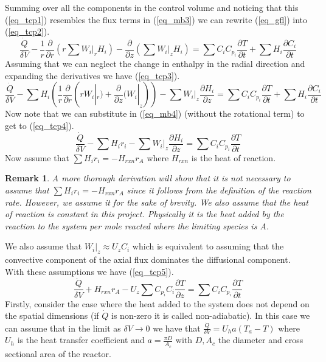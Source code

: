 \documentclass[11pt,fleqn]{article}
\theoremstyle{defstyle}
\newtheorem{rmrk}{Remark}[section]
\begin{document}
Summing over all the components in the control volume and noticing that this (\ref{eq_tcp1}) resembles the flux terms in (\ref{eq_mb3}) we can rewrite (\ref{eq_gfl}) into (\ref{eq_tcp2}).
\begin{equation}
\frac{\dot{Q}}{\delta V} - \frac{1}{r}\frac{\partial}{\partial r}(r\sum W_i|_r H_i) - \frac{\partial}{\partial z}(\sum W_i|_z H_i) =\sum C_i C_{p_i} \frac{\partial T}{\partial t} + \sum H_i \frac{\partial C_i}{\partial t}
\label{eq_tcp2}
\end{equation}
Assuming that we can neglect the change in enthalpy in the radial direction and expanding the derivatives we have (\ref{eq_tcp3}).
\begin{equation}
\frac{\dot{Q}}{\delta V} - \sum H_i (\frac{1}{r}\frac{\partial}{\partial r}(r W_i|_r)+\frac{\partial}{\partial z}(W_i|_z)) - \sum W_i|_z \frac{\partial H_i}{\partial z} =\sum C_i C_{p_i} \frac{\partial T}{\partial t} + \sum H_i \frac{\partial C_i}{\partial t}
\label{eq_tcp3}
\end{equation}
Now note that we can substitute in (\ref{eq_mb4}) (without the rotational term) to get to (\ref{eq_tcp4}).
\begin{equation}
\frac{\dot{Q}}{\delta V} - \sum H_i r_i - \sum W_i|_z \frac{\partial H_i}{\partial z} =\sum C_i C_{p_i} \frac{\partial T}{\partial t}
\label{eq_tcp4}
\end{equation}
Now assume that $\sum H_i r_i = -H_{rxn}r_A$ where $H_{rxn}$ is the heat of reaction.
\begin{rmrk}
A more thorough derivation will show that it is not necessary to assume that $\sum H_i r_i = -H_{rxn}r_A$ since it follows from the definition of the reaction rate. However, we assume it for the sake of brevity. We also assume that the heat of reaction is constant in this project. Physically it is the heat added by the reaction to the system per mole reacted where the limiting species is A.
\end{rmrk}
We also assume that $W_i|_z \approx U_z C_i$ which is equivalent to assuming that the convective component of the axial flux dominates the diffusional component. With these assumptions we have (\ref{eq_tcp5}).
\begin{equation}
\frac{\dot{Q}}{\delta V} + H_{rxn}r_A - U_z\sum C_{p_i}C_i \frac{\partial T}{\partial z} =\sum C_i C_{p_i} \frac{\partial T}{\partial t}
\label{eq_tcp5}
\end{equation}
Firstly, consider the case where the heat added to the system does not depend on the spatial dimensions (if $\dot{Q}$ is non-zero it is called non-adiabatic). In this case we can assume that in the limit as $\delta V \rightarrow 0 $ we have that $\frac{\dot{Q}}{\delta V} = U_ha(T_a-T)$ where $U_h$ is the heat transfer coefficient and $a = \frac{\pi D}{A_c}$ with $D, A_c$ the diameter and cross sectional area of the reactor.
\end{document}
